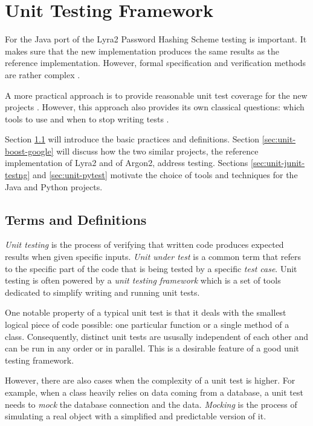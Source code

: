 \chapter{Unit Testing Framework}
\label{chapter:unit-testing-framework}

For the Java port of the Lyra2 Password Hashing Scheme testing is important. It makes sure that the new implementation produces the same results as the reference implementation. However, formal specification and verification methods are rather complex \cite{lamsweerde:2000:formal-specification, mueller:1994:formal-specification}.

A more practical approach is to provide reasonable unit test coverage for the new projects \cite{williams:2010:unit-tests-rock}. However, this approach also provides its own classical questions: which tools to use \cite{daka:2014:unit-testing-tools} and when to stop writing tests \cite{elberzhager:2012:reducing-effort}.

Section \ref{sec:unit-terms-and-definitions} will introduce the basic practices and definitions. Section \ref{sec:unit-boost-google} will discuss how the two similar projects, the reference implementation of Lyra2 and of Argon2, address testing. Sections \ref{sec:unit-junit-testng} and \ref{sec:unit-pytest} motivate the choice of tools and techniques for the Java and Python projects.

\section{Terms and Definitions}
\label{sec:unit-terms-and-definitions}

\emph{Unit testing} is the process of verifying that written code produces expected results when given specific inputs. \emph{Unit under test} is a common term that refers to the specific part of the code that is being tested by a specific \emph{test case}. Unit testing is often powered by a \emph{unit testing framework} which is a set of tools dedicated to simplify writing and running unit tests.

One notable property of a typical unit test is that it deals with the smallest logical piece of code possible: one particular function or a single method of a class. Consequently, distinct unit tests are ususally independent of each other and can be run in any order or in parallel. This is a desirable feature of a good unit testing framework.

However, there are also cases when the complexity of a unit test is higher. For example, when a class heavily relies on data coming from a database, a unit test needs to \emph{mock} the database connection and the data. \emph{Mocking} is the process of simulating a real object with a simplified and predictable version of it.

